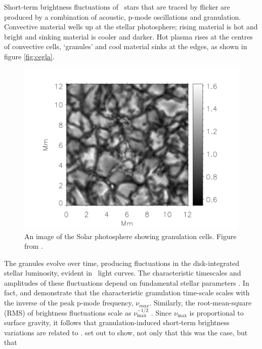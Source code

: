 Short-term brightness fluctuations of \kepler\ stars that are traced by
flicker are produced by a combination of acoustic, p-mode oscillations and
granulation.
Convective material wells up at the stellar photosphere; rising material is
hot and bright and sinking material is cooler and darker.
Hot plasma rises at the centres of convective cells, `granules' and cool
material sinks at the edges, as shown in figure \ref{fig:cegla}.
\begin{figure}
\begin{center}
\includegraphics[width=6in,angle=0,clip=true]{figures/cegla.pdf}
\caption[Granulation on the Solar surface \citep[from][]{Cegla2013}.]
{An image of the Solar photosphere showing granulation cells. Figure from
\citet{Cegla2013}.}
\label{fig:rhostar}
\end{center}
\end{figure}
The granules evolve over time, producing fluctuations in the disk-integrated
stellar luminosity, evident in \kepler\ light curves.
The characteristic timescales and amplitudes of these fluctuations depend on
fundamental stellar parameters \citep[\eg][]{Samadi2013, Samadi2013b}.
In fact, \citet{Kallinger2010} and \citet{Mathur2011} demonstrate that the
characteristic granulation time-scale scales with the inverse of the
peak p-mode frequency, $\nu_{max}$.
Similarly, the root-mean-square (RMS) of brightness fluctuations scale as
$\nu_{\mathrm{max}}^{-1/2}$ \citep{Mathur2011, Chaplin2011}.
Since $\nu_{\mathrm{max}}$ is proportional to surface gravity, it follows that
granulation-induced short-term brightness variations are related to \logg.
\citet{Bastien2013} set out to show, not only that this was the case, but that
